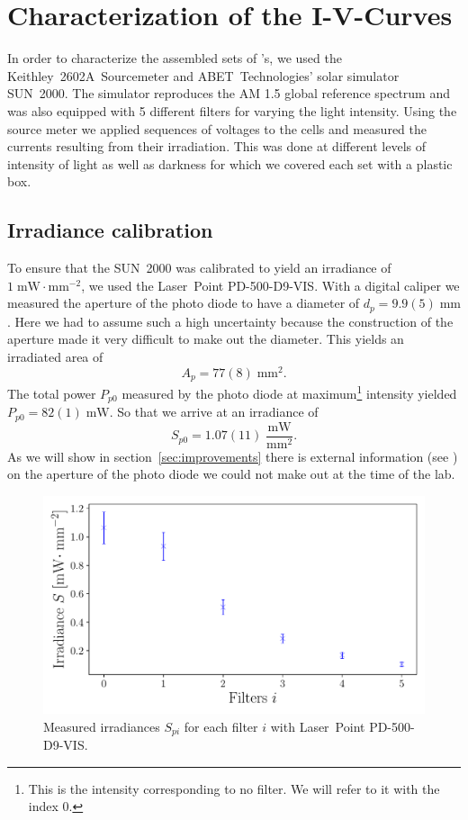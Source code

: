 
\section{Characterization of the I-V-Curves}\label{sec:charac}

In order to characterize the assembled sets of \BHSC's, we used the Keithley~2602A~Sourcemeter and ABET~Technologies’ solar simulator SUN~2000. The simulator reproduces the AM 1.5 global reference spectrum and was also equipped with 5 different filters for varying the light intensity. Using the source meter we applied sequences of voltages to the cells and measured the currents resulting from their irradiation. This was done at different levels of intensity of light as well as darkness for which we covered each set with a plastic box.
\subsection{Irradiance calibration}
To ensure that the SUN~2000 was calibrated to yield an irradiance of $1\;\text{mW}\!\cdot\text{mm}^{-2}$, we used the Laser~Point PD-500-D9-VIS. With a digital caliper we measured the aperture of the photo diode to have a diameter of $d_p = 9.9(5)\;\text{mm}$. Here we had to assume such a high uncertainty because the construction of the aperture made it very difficult to make out the diameter. This yields an irradiated area of
\begin{equation*}
A_p =  77(8)\;\text{mm}^2.
\end{equation*}
The total power $P_{p0}$ measured by the photo diode at maximum\footnote{This is the intensity corresponding to no filter. We will refer to it with the index 0.} intensity yielded $P_{p0} = 82(1)\;\text{mW}$. So that we arrive at an irradiance of
\begin{equation*}
S_{p0} = 1.07(11)\;\frac{\text{mW}}{\text{mm}^2}.
\end{equation*}
As we will show in section~\ref{sec:improvements} there is external information (see \cite{photodiode}) on the aperture of the photo diode we could not make out at the time of the lab.
\begin{figure}[h]
\includegraphics[scale=0.5]{../2_Pictures/Photodiode_irradiance.pdf}
\caption{Measured irradiances $S_{pi}$ for each filter $i$ with Laser~Point PD-500-D9-VIS.}
\label{fig:photodiode_irradiances}
\end{figure}

